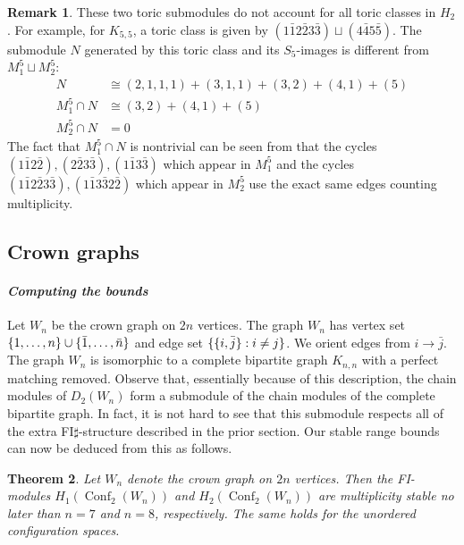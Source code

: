 \documentclass[12pt]{amsart}
\newtheorem{thm}{Theorem}[section]
\theoremstyle{definition}
\newtheorem{rmk}[thm]{Remark}
\newcommand{\conf}{\operatorname{Conf}}
\newcommand{\Sp}{\mathrm{Sp}}
\begin{document}
\begin{rmk}
These two toric submodules do not account for all toric classes in $H_2$. For example, for $K_{5,5}$, a toric class is given by $(1\bar12\bar23\bar3)\sqcup(4\bar45\bar5)$. The submodule $N$ generated by this toric class and its $S_5$-images is different from $M_1^5\sqcup M_2^5$: 
\begin{align*}
    N &\cong (2, 1, 1, 1) + (3, 1, 1) + (3, 2) + (4, 1) + (5)\\
    M_{1}^5\cap N &\cong (3, 2) + (4, 1) + (5)\\
    M_2^5\cap N &= 0
\end{align*} The fact that $M_{1}^5\cap N$ is nontrivial can be seen from that the cycles $(1\bar12\bar2),(2\bar23\bar3),(1\bar13\bar3)$ which appear in $M_1^5$ and the cycles $(1\bar12\bar23\bar3),(1\bar13\bar32\bar2)$ which appear in $M_2^5$ use the exact same edges counting multiplicity.
\end{rmk}

\subsection{Crown graphs}

\paragraph{\textit{Computing the bounds}}
Let $W_n$ be the crown graph on $2n$ vertices. The graph $W_n$ has vertex set $\{1,\dots,n\}\cup \{\Bar{1},\dots,\Bar{n}\}$ and edge set $\{\{i,\Bar{j}\}: i\neq j\}$. We orient edges from $i\to\bar j$. The graph $W_n$ is isomorphic to a complete bipartite graph $K_{n,n}$ with a perfect matching removed. Observe that, essentially because of this description, the chain modules of $D_2(W_n)$ form a submodule of the chain modules of the complete bipartite graph. In fact, it is not hard to see that this submodule respects all of the extra FI$\sharp$-structure described in the prior section. Our stable range bounds can now be deduced from this as follows.

\begin{thm} \label{crownBound}
Let $W_n$ denote the crown graph on $2n$ vertices. Then the FI-modules $H_1(\conf_2(W_n))$ and $H_2(\conf_2(W_n))$ are multiplicity stable no later than $n = 7$ and $n = 8$, respectively. The same holds for the unordered configuration spaces.
\end{thm}
\end{document}
